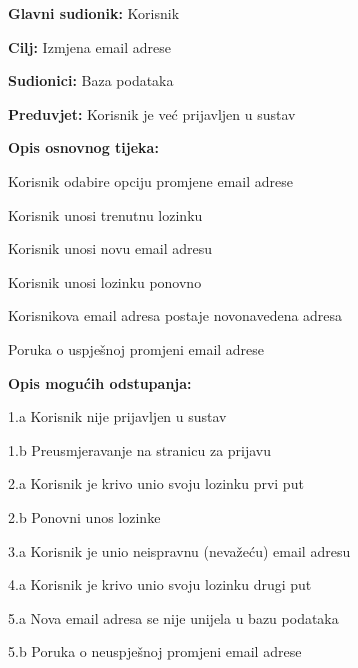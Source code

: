 					\noindent {}
					\begin{packed_item}
						\item \textbf{Glavni sudionik:} Korisnik
						\item \textbf{Cilj:} Izmjena email adrese
						\item \textbf{Sudionici:} Baza podataka
						\item \textbf{Preduvjet:} Korisnik je već prijavljen u sustav
						\item \textbf{Opis osnovnog tijeka:}
						\begin{packed_enum}
							\item Korisnik odabire opciju promjene email adrese
							\item Korisnik unosi trenutnu lozinku
							\item Korisnik unosi novu email adresu
							\item Korisnik unosi lozinku ponovno
							\item Korisnikova email adresa postaje novonavedena adresa
							\item Poruka o uspješnoj promjeni email adrese
						\end{packed_enum}
						\item \textbf{Opis mogućih odstupanja:}
						\begin{packed_item}
							\item 1.a Korisnik nije prijavljen u sustav
							\item 1.b Preusmjeravanje na stranicu za prijavu
							\item 2.a Korisnik je krivo unio svoju lozinku prvi put
							\item 2.b Ponovni unos lozinke
							\item 3.a Korisnik je unio neispravnu (nevažeću) email adresu
							\item 4.a Korisnik je krivo unio svoju lozinku drugi put
							\item 5.a Nova email adresa se nije unijela u bazu podataka
							\item 5.b Poruka o neuspješnoj promjeni email adrese
						\end{packed_item}
					\end{packed_item}

